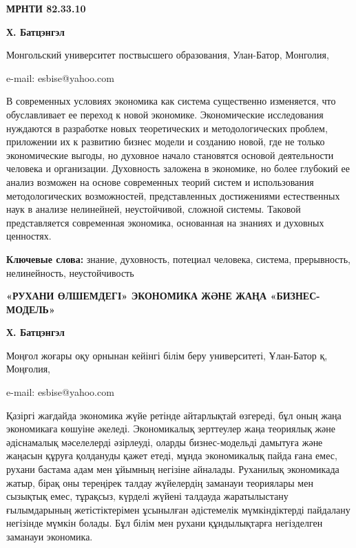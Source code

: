 \newpage
{\bfseries МРНТИ 82.33.10}


\begin{center}
{\bfseries Х. Батцэнгэл}

Монгольский университет поствысшего образования, Улан-Батор, Монголия,

e-mail: esbise@yahoo.com
\end{center}

В современных условиях экономика как система существенно изменяется, что
обуславливает ее переход к новой экономике. Экономические исследования
нуждаются в разработке новых теоретических и методологических проблем,
приложении их к развитию бизнес модели и созданию новой, где не только
экономические выгоды, но духовное начало становятся основой деятельности
человека и организации. Духовность заложена в экономике, но более
глубокий ее анализ возможен на основе современных теорий систем и
использования методологических возможностей, представленных достижениями
естественных наук в анализе нелинейней, неустойчивой, сложной системы.
Таковой представляется современная экономика, основанная на знаниях и
духовных ценностях.

{\bfseries Ключевые слова:} знание, духовность, потециал человека, система,
прерывность, нелинейность, неустойчивость

\begin{center}
{\large\bfseries «РУХАНИ ӨЛШЕМДЕГІ» ЭКОНОМИКА ЖӘНЕ ЖАҢА «БИЗНЕС-МОДЕЛЬ»}

{\bfseries Х. Батцэнгэл}

Моңғол жоғары оқу орнынан кейінгі білім беру университеті, Ұлан-Батор қ,
Моңғолия,

e-mail: esbise@yahoo.com
\end{center}

Қазіргі жағдайда экономика жүйе ретінде айтарлықтай өзгереді, бұл оның
жаңа экономикаға көшуіне әкеледі. Экономикалық зерттеулер жаңа теориялық
және әдіснамалық мәселелерді әзірлеуді, оларды бизнес-модельді дамытуға
және жаңасын құруға қолдануды қажет етеді, мұнда экономикалық пайда ғана
емес, рухани бастама адам мен ұйымның негізіне айналады. Руханилық
экономикада жатыр, бірақ оны тереңірек талдау жүйелердің заманауи
теориялары мен сызықтық емес, тұрақсыз, күрделі жүйені талдауда
жаратылыстану ғылымдарының жетістіктерімен ұсынылған әдістемелік
мүмкіндіктерді пайдалану негізінде мүмкін болады. Бұл білім мен рухани
құндылықтарға негізделген заманауи экономика.

